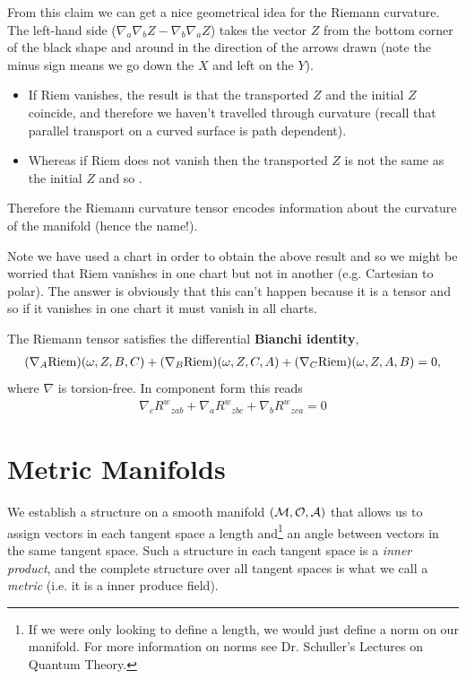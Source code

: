 \documentclass[12pt]{article} %
\begin{document}
\ecl 
From this claim we can get a nice geometrical idea for the Riemann curvature. The left-hand side ($\nabla_a\nabla_b Z-\nabla_b\nabla_aZ$) takes the vector $Z$ from the bottom corner of the black shape and around in the direction of the arrows drawn (note the minus sign means we go down the $X$ and left on the $Y$). 
\begin{itemize}
    \item If Riem vanishes, the result is that the transported $Z$ and the initial $Z$ coincide, and therefore we haven't travelled through curvature (recall that parallel transport on a curved surface is path dependent). 
    \item Whereas if Riem does not vanish then the transported $Z$ is not the same as the initial $Z$ and so . 
\end{itemize}Therefore the Riemann curvature tensor encodes information about the curvature of the manifold (hence the name!).

\br 
    Note we have used a chart in order to obtain the above result and so we might be worried that Riem vanishes in one chart but not in another (e.g. Cartesian to polar). The answer is obviously that this can't happen because it is a tensor and so if it vanishes in one chart it must vanish in all charts.
\er 

\bl 
    The Riemann tensor satisfies the differential \textbf{Bianchi identity}, 
    \begin{align*}
        (\nabla_A\mathrm{Riem})(\omega,Z,B,C) + (\nabla_B\mathrm{Riem})(\omega,Z,C,A) + (\nabla_C\mathrm{Riem})(\omega,Z,A,B) = 0,
    \end{align*}
    where $\nabla$ is torsion-free. In component form this reads 
    \begin{align*}
        \nabla_c{R^w}_{zab} + \nabla_a{R^w}_{zbc} + \nabla_b{R^w}_{zca} = 0 
    \end{align*}
\el 



\section{Metric Manifolds}
We establish a structure on a smooth manifold $(\mathcal{M},\mathcal{O},\mathcal{A})$ that allows us to assign vectors in each tangent space a length and\footnote{If we were only looking to define a length, we would just define a norm on our manifold. For more information on norms see Dr. Schuller's Lectures on Quantum Theory.} an angle between vectors in the same tangent space. Such a structure in each tangent space is a \textit{inner product}, and the complete structure over all tangent spaces is what we call a \textit{metric} (i.e. it is a inner produce field). 
\end{document}
